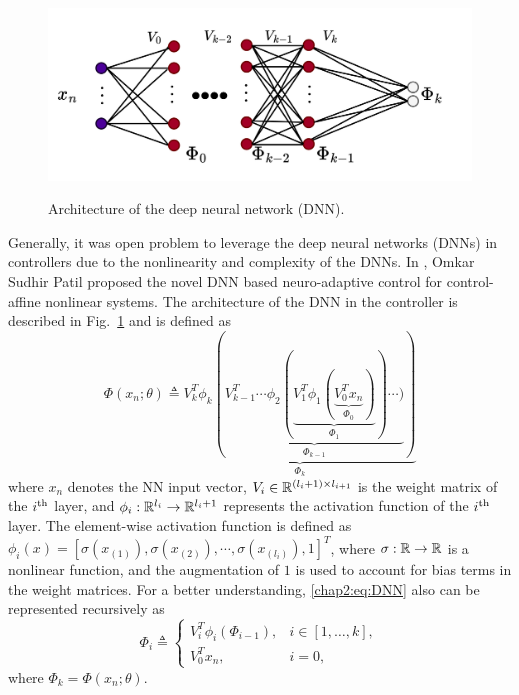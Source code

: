 \begin{figure}[!t]      
  \centering
  {\includegraphics[width=.85\linewidth]{imgs/NN.drawio.png}}
  \caption{Architecture of the deep neural network (DNN).}
  \label{chap2:fig:DNN}
\end{figure}

Generally, it was open problem to leverage the deep neural networks (DNNs) in controllers due to the nonlinearity and complexity of the DNNs.
In \cite{RN13}, Omkar Sudhir Patil \etal proposed the novel DNN based neuro-adaptive control for control-affine nonlinear systems.
The architecture of the DNN in the controller is described in Fig.~\ref{chap2:fig:DNN} and is defined as 
\begin{equation}
  \Phi(x_n;\theta) \triangleq 
  \underbrace{
    V_k^T  \phi_{k}(
    \underbrace{
      V_{k-1}^T   \cdots \phi_2(
      \underbrace
        {
        V_1^T   \phi_1(
        \underbrace
          {
          V_0^T   x_n
        }_{\Phi_0}
        )
      }_{\Phi_1}
      )\cdots )
    }_{\Phi_{k-1}}
    )
  }_{\Phi_k}
  \label{chap2:eq:DNN}
\end{equation}
where $x_n$ denotes the NN input vector, $V_i\in\mathbb{R}^{(l_i+1)\times l_{i+1}}$ is the weight matrix of the $i\textsuperscript{th}$ layer, and $\phi_i: \mathbb{R}^{l_i}\to\mathbb{R}^{l_i+1}$ represents the activation function of the $i\textsuperscript{th}$ layer. 
The element-wise activation function is defined as $\phi_i(x)=[\sigma(x_{(1)}),\sigma(x_{(2)}),\cdots, \sigma(x_{(l_{i})}), 1]^T$, where $\sigma: \mathbb{R}\to\mathbb{R}$ is a nonlinear function, and the augmentation of $1$ is used to account for bias terms in the weight matrices.  
For a better understanding, \eqref{chap2:eq:DNN} also can be represented recursively as 
\begin{equation}
    \Phi_i \triangleq
    \begin{cases}
        V_i^T  \phi_i(\Phi_{i-1}), &i\in[1,\dots,k],\\
        V_0^T  x_n,&i=0,
    \end{cases}
\end{equation}
where $\Phi_k = \Phi(x_n;\theta)$.


